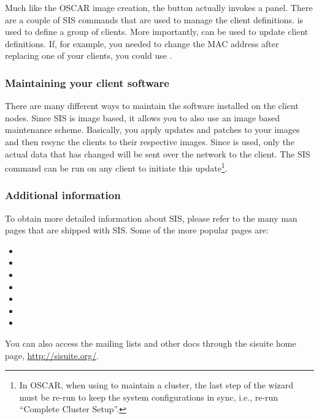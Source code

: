 Much like the OSCAR image creation, the 
button actually invokes a  panel. There are a couple of SIS
commands that are used to manage the client definitions.
 is used to define a group of clients. More
importantly,  can be used to update client
definitions. If, for example, you needed to change the MAC address
after replacing one of your clients, you could use .

\subsubsection{Maintaining your client software}

There are many different ways to maintain the software installed on the client
nodes. Since SIS is image based, it allows you to also use an image based 
maintenance scheme. Basically, you apply updates and patches to your images 
and then resync the clients to their respective images. Since  is
used, only the actual data that has changed will be sent over the network to 
the client. The SIS command  can be run on any client to
initiate this update\footnote{In OSCAR, when using  to
maintain a cluster, the last step of the wizard must be re-run to keep the
system configurations in sync, i.e., re-run ``Complete Cluster Setup''.}.

\subsubsection{Additional information}

To obtain more detailed information about SIS, please refer to the many man
pages that are shipped with SIS. Some of the more popular pages are:

\begin{itemize}
\item {}
\item {}
\item {}
\item {}
\item {}
\item {}
\item {}
\end{itemize}

You can also access the mailing lists and other docs through the sisuite
home page, \url{http://sisuite.org/}.
